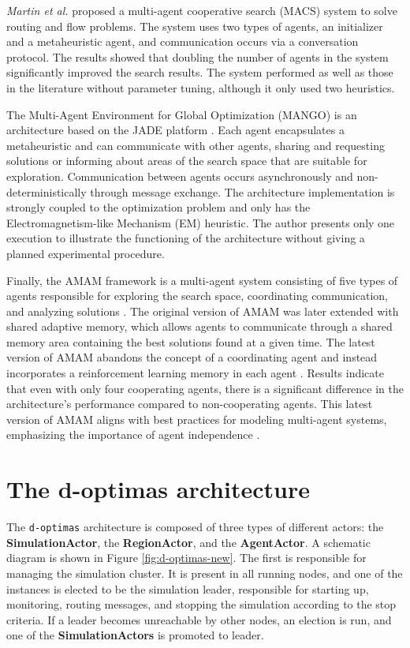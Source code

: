 \documentclass[preprint,12pt]{elsarticle}
\begin{document}
\textit{Martin et al.} \cite{martin2016} proposed a multi-agent cooperative search (MACS) system to solve routing and flow problems. The system uses two types of agents, an initializer and a metaheuristic agent, and communication occurs via a conversation protocol. The results showed that doubling the number of agents in the system significantly improved the search results. The system performed as well as those in the literature without parameter tuning, although it only used two heuristics.

The Multi-Agent Environment for Global Optimization (MANGO) is an architecture based on the JADE platform \cite{kerccelli2008}. Each agent encapsulates a metaheuristic and can communicate with other agents, sharing and requesting solutions or informing about areas of the search space that are suitable for exploration. Communication between agents occurs asynchronously and non-deterministically through message exchange. The architecture implementation is strongly coupled to the optimization problem and only has the Electromagnetism-like Mechanism (EM) heuristic. The author presents only one execution to illustrate the functioning of the architecture without giving a planned experimental procedure.

Finally, the AMAM framework is a multi-agent system consisting of five types of agents responsible for exploring the search space, coordinating communication, and analyzing solutions \cite{silva2007}. The original version of AMAM was later extended with shared adaptive memory, which allows agents to communicate through a shared memory area containing the best solutions found at a given time. The latest version of AMAM abandons the concept of a coordinating agent and instead incorporates a reinforcement learning memory in each agent \cite{fernandes2009}. Results indicate that even with only four cooperating agents, there is a significant difference in the architecture's performance compared to non-cooperating agents. This latest version of AMAM aligns with best practices for modeling multi-agent systems, emphasizing the importance of agent independence \cite{silva2015}.


\section{The d-optimas architecture}
\label{sec:architecture}
The \texttt{d-optimas} architecture is composed of three types of different actors: the \textbf{SimulationActor}, the \textbf{RegionActor}, and the \textbf{AgentActor}. A schematic diagram is shown in Figure \ref{fig:d-optimas-new}. The first is responsible for managing the simulation cluster. It is present in all running nodes, and one of the instances is elected to be the simulation leader, responsible for starting up, monitoring, routing messages, and stopping the simulation according to the stop criteria. If a leader becomes unreachable by other nodes, an election is run, and one of the \textbf{SimulationActors} is promoted to leader. 
\end{document}
